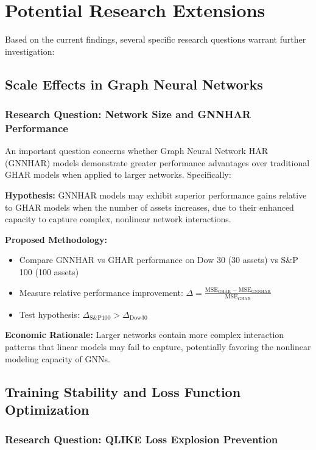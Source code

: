 \documentclass[12pt,a4paper]{article}
\begin{document}
\section{Potential Research Extensions}

Based on the current findings, several specific research questions warrant further investigation:

\subsection{Scale Effects in Graph Neural Networks}

\subsubsection{Research Question: Network Size and GNNHAR Performance}

An important question concerns whether Graph Neural Network HAR (GNNHAR) models demonstrate greater performance advantages over traditional GHAR models when applied to larger networks. Specifically:

\textbf{Hypothesis:} GNNHAR models may exhibit superior performance gains relative to GHAR models when the number of assets increases, due to their enhanced capacity to capture complex, nonlinear network interactions.

\textbf{Proposed Methodology:}
\begin{itemize}
\item Compare GNNHAR vs GHAR performance on Dow 30 (30 assets) vs S\&P 100 (100 assets)
\item Measure relative performance improvement: $\Delta = \frac{\text{MSE}_{\text{GHAR}} - \text{MSE}_{\text{GNNHAR}}}{\text{MSE}_{\text{GHAR}}}$
\item Test hypothesis: $\Delta_{\text{S\&P100}} > \Delta_{\text{Dow30}}$
\end{itemize}

\textbf{Economic Rationale:} Larger networks contain more complex interaction patterns that linear models may fail to capture, potentially favoring the nonlinear modeling capacity of GNNs.

\subsection{Training Stability and Loss Function Optimization}

\subsubsection{Research Question: QLIKE Loss Explosion Prevention}
\end{document}
